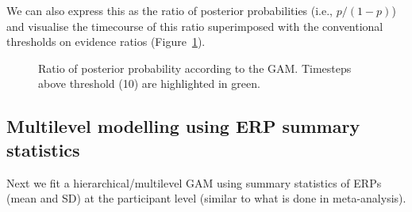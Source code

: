 \documentclass[
  doc,
  floatsintext,
  longtable,
  a4paper,
  nolmodern,
  notxfonts,
  notimes,
  colorlinks=true,linkcolor=blue,citecolor=blue,urlcolor=blue]{apa7}
\begin{document}
We can also express this as the ratio of posterior probabilities (i.e.,
\(p/(1-p)\)) and visualise the timecourse of this ratio superimposed
with the conventional thresholds on evidence ratios
(Figure~\ref{fig-post-prob-ratio}).

\begin{figure}[!htb]

\caption{\label{fig-post-prob-ratio}Ratio of posterior probability
according to the GAM. Timesteps above threshold (10) are highlighted in
green.}


\end{figure}%

\newpage

\subsection{Multilevel modelling using ERP summary
statistics}\label{multilevel-modelling-using-erp-summary-statistics}

Next we fit a hierarchical/multilevel GAM using summary statistics of
ERPs (mean and SD) at the participant level (similar to what is done in
meta-analysis).
\end{document}
